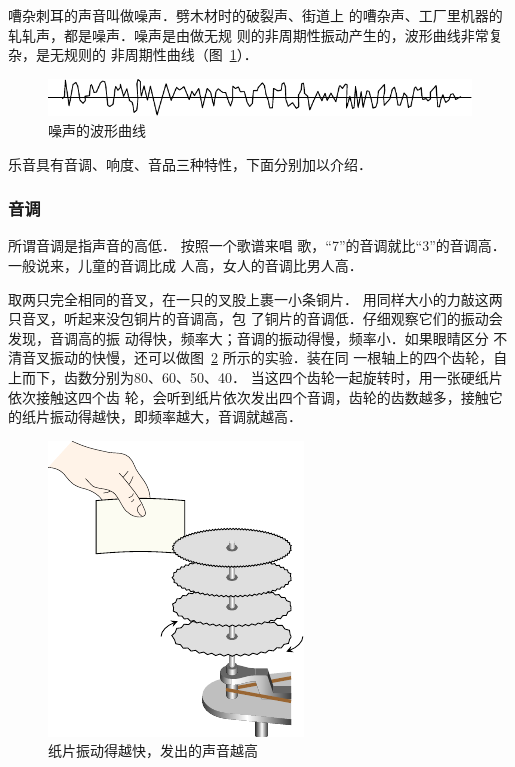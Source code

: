 嘈杂刺耳的声音叫做噪声．劈木材时的破裂声、街道上
的嘈杂声、工厂里机器的轧轧声，都是噪声．噪声是由做无规
则的非周期性振动产生的，波形曲线非常复杂，是无规则的
非周期性曲线（图~\ref{fig_A_9-31}）．
\begin{figure}[htbp]
    \centering
    \includegraphics{fig/A/9-31.pdf}
    \caption{噪声的波形曲线}\label{fig_A_9-31}
\end{figure}


乐音具有音调、响度、音品三种特性，下面分别加以介绍．

\subsubsection{音调}


所谓音调是指声音的高低．
按照一个歌谱来唱
歌，“7”的音调就比“3”的音调高．一般说来，儿童的音调比成
人高，女人的音调比男人高．

取两只完全相同的音叉，在一只的叉股上裹一小条铜片．
用同样大小的力敲这两只音叉，听起来没包铜片的音调高，包
了铜片的音调低．仔细观察它们的振动会发现，音调高的振
动得快，频率大；音调的振动得慢，频率小．如果眼晴区分
不清音叉振动的快慢，还可以做图~\ref{fig_A_9-32} 所示的实验．装在同
一根轴上的四个齿轮，自上而下，齿数分别为80、60、50、40．
当这四个齿轮一起旋转时，用一张硬纸片依次接触这四个齿
轮，会听到纸片依次发出四个音调，齿轮的齿数越多，接触它
的纸片振动得越快，即频率越大，音调就越高．
\begin{figure}[htbp]
    \centering
    \includegraphics{fig/A/9-32.pdf}
    \caption{纸片振动得越快，发出的声音越高}\label{fig_A_9-32}
\end{figure}

